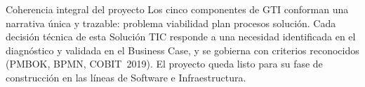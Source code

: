 \begin{upeubox}{Coherencia integral del proyecto}
Los cinco componentes de GTI conforman una narrativa única y trazable: problema
\textrightarrow{} viabilidad \textrightarrow{} plan \textrightarrow{} procesos
\textrightarrow{} solución. Cada decisión técnica de esta Solución TIC responde a una
necesidad identificada en el diagnóstico y validada en el Business Case, y se gobierna
con criterios reconocidos (PMBOK, BPMN, COBIT~2019). El proyecto queda listo para su
fase de construcción en las líneas de Software e Infraestructura.
\end{upeubox}
